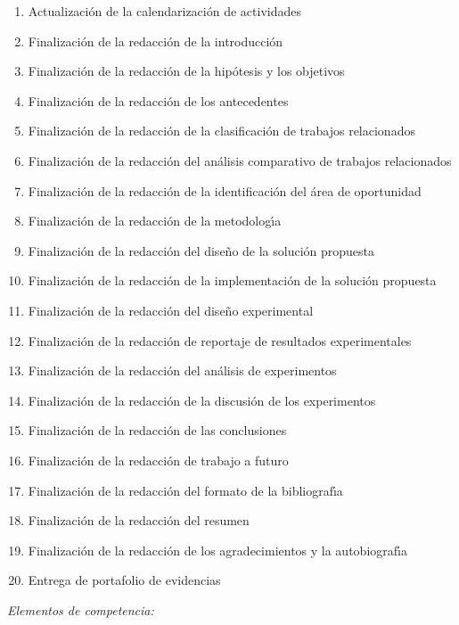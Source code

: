 \documentclass[10 pt]{article}
\begin{document}
\begin{enumerate}[itemsep=-2pt]
\item Actualizaci\'{o}n de la calendarizaci\'{o}n de actividades
\item Finalizaci\'{o}n de la redacci\'{o}n de la introducci\'{o}n
\item Finalizaci\'{o}n de la redacci\'{o}n de la hip\'{o}tesis y los objetivos
\item Finalizaci\'{o}n de la redacci\'{o}n de los antecedentes
\item Finalizaci\'{o}n de la redacci\'{o}n de la clasificaci\'{o}n de trabajos relacionados
\item Finalizaci\'{o}n de la redacci\'{o}n del an\'{a}lisis comparativo de trabajos relacionados
\item Finalizaci\'{o}n de la redacci\'{o}n de la identificaci\'{o}n del \'{a}rea de oportunidad
\item Finalizaci\'{o}n de la redacci\'{o}n de la metodolog\'{\i}a
\item Finalizaci\'{o}n de la redacci\'{o}n del dise\~{n}o de la soluci\'{o}n propuesta
\item Finalizaci\'{o}n de la redacci\'{o}n de la implementaci\'{o}n de la soluci\'{o}n propuesta
\item Finalizaci\'{o}n de la redacci\'{o}n del dise\~{n}o experimental
\item Finalizaci\'{o}n de la redacci\'{o}n de reportaje de resultados experimentales
\item Finalizaci\'{o}n de la redacci\'{o}n del an\'{a}lisis de experimentos
\item Finalizaci\'{o}n de la redacci\'{o}n de la discusi\'{o}n de los experimentos
\item Finalizaci\'{o}n de la redacci\'{o}n de las conclusiones
\item Finalizaci\'{o}n de la redacci\'{o}n de trabajo a futuro
\item Finalizaci\'{o}n de la redacci\'{o}n del formato de la bibliograf\'{\i}a
\item Finalizaci\'{o}n de la redacci\'{o}n del resumen
\item Finalizaci\'{o}n de la redacci\'{o}n de los agradecimientos y la autobiograf\'{\i}a
\item Entrega de portafolio de evidencias
\end{enumerate}

{\em Elementos de competencia:}


\end{document}
